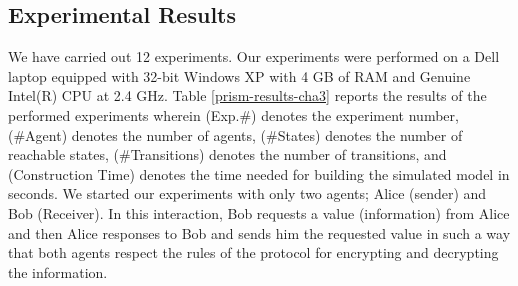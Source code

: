 \subsection{Experimental Results}\label{sec:experimental-results-cha3}

We have carried out 12 experiments. Our experiments were performed on a Dell laptop equipped with 32-bit Windows XP with 4 GB of RAM and Genuine Intel(R) CPU at 2.4 GHz. Table \ref{prism-results-cha3} reports the results of the performed experiments wherein (Exp.\#) denotes the experiment number, (\#Agent) denotes the number of agents, (\#States) denotes the number of reachable states, (\#Transitions) denotes the number of transitions, and (Construction Time) denotes the time needed for building the simulated model in seconds. We started our experiments with only two agents; Alice (sender) and Bob (Receiver). In this interaction, Bob requests a value
(information) from Alice and then Alice responses to Bob and sends
him the requested value in such a way that both agents respect the
rules of the protocol for encrypting and decrypting the
information.

\begin{table}%
\centering \caption{Verification results of the oblivious transfer
protocol} \label{prism-results-cha3}
\end{table}

